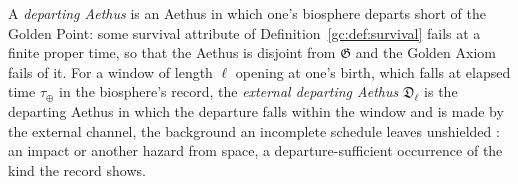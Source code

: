 \begin{definition}\label{gc:def:departing}
A \emph{departing Aethus} is an Aethus in which one's biosphere departs
short of the Golden Point: some survival attribute of
Definition~\ref{gc:def:survival} fails at a finite proper time, so that
the Aethus is disjoint from $\mathfrak G$ and the Golden Axiom fails of
it. For a window of length $\ell$ opening at one's birth, which falls at
elapsed time $\tau_\oplus$ in the biosphere's record, the \emph{external
departing Aethus} $\mathfrak D_\ell$ is the departing Aethus in which the
departure falls within the window and is made by the external channel,
the background an incomplete schedule leaves unshielded
\cite{GoldenTechnoanatomy}: an impact or another hazard from space, a
departure-sufficient occurrence of the kind the record shows.
\end{definition}

